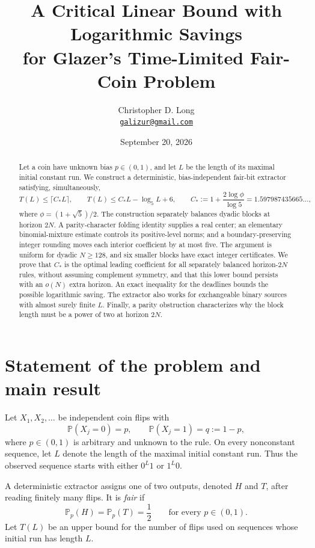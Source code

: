 \documentclass[11pt]{article}
\title{A Critical Linear Bound with Logarithmic Savings\\
for Glazer's Time-Limited Fair-Coin Problem}
\author{Christopher D. Long\\[3pt]
\small\href{mailto:galizur@gmail.com}{\texttt{galizur@gmail.com}}}
\date{September 20, 2026}
\theoremstyle{definition}
\theoremstyle{remark}
\begin{document}
\maketitle

\begin{abstract}
Let a coin have unknown bias $p\in(0,1)$, and let $L$ be the length of its
maximal initial constant run. We construct a deterministic, bias-independent
fair-bit extractor satisfying, simultaneously,
\[
 T(L)\le\lceil C_*L\rceil,
 \qquad
 T(L)\le C_*L-\log_5L+6,
 \qquad
 C_*:=1+\frac{2\log\phi}{\log5}=1.597987435665\ldots,
\]
where $\phi=(1+\sqrt5)/2$.
The construction separately balances dyadic blocks at horizon $2N$.
A parity-character folding identity supplies a real center; an elementary
binomial-mixture estimate controls its positive-level norms; and a
boundary-preserving integer rounding moves each interior coefficient by at
most five. The argument is uniform for dyadic $N\ge128$, and six smaller
blocks have exact integer certificates.
We prove that $C_*$ is the optimal leading coefficient for all separately
balanced horizon-$2N$ rules, without assuming complement symmetry, and
that this lower bound persists with an $o(N)$ extra horizon. An exact
inequality for the deadlines bounds the possible logarithmic saving.
The extractor also works for exchangeable binary sources with almost surely
finite $L$. Finally, a parity obstruction characterizes why the block
length must be a power of two at horizon $2N$.
\end{abstract}

\begingroup
\small
\makeatletter
\renewcommand{\l@section}[2]{\@dottedtocline{1}{0em}{1.8em}{#1}{#2}}
\makeatother
\tableofcontents
\endgroup
\clearpage

\section{Statement of the problem and main result}

Let $X_1,X_2,\ldots$ be independent coin flips with
\[
 \mathbb P(X_j=0)=p,
 \qquad
 \mathbb P(X_j=1)=q:=1-p,
\]
where $p\in(0,1)$ is arbitrary and unknown to the rule.  On every nonconstant sequence, let $L$ denote the length of the maximal initial constant run.  Thus the observed sequence starts with either $0^L1$ or $1^L0$.

A deterministic extractor assigns one of two outputs, denoted $H$ and $T$, after reading finitely many flips.  It is \emph{fair} if
\[
 \mathbb P_p(H)=\mathbb P_p(T)=\frac12
 \qquad\text{for every }p\in(0,1).
\]
Let $T(L)$ be an upper bound for the number of flips used on sequences whose initial run has length $L$.
\end{document}
